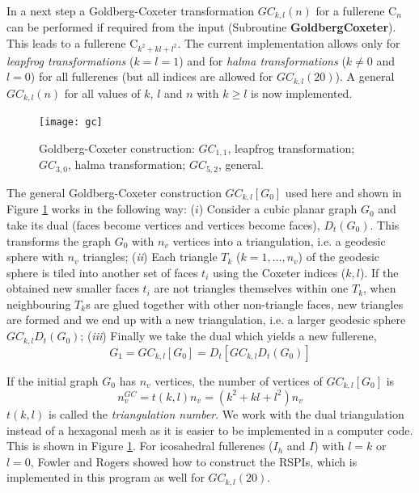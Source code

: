 \documentclass[article,a4paper,twoside]{memoir}
\newcommand{\C}[1]{\ensuremath{\mathrm{C}_{#1}}}
\newcommand{\funname}[1]{{\color{blue}\textbf{#1}}}
\begin{document}
In a next step a Goldberg-Coxeter transformation $GC_{k,l}(n)$ for a fullerene \C{n} can be performed if required from the input
(Subroutine \funname{GoldbergCoxeter}). This leads to a fullerene C$_{k^2+kl+l^2}$. The current implementation allows only for
\textit{leapfrog transformations} ($k=l=1$) and for \textit{halma transformations} ($k \neq 0$ and $l=0$) for all fullerenes
(but all indices are allowed for $GC_{k,l}(20)$). A general $GC_{k,l}(n)$ for all values of $k$, $l$ and $n$ with $k \geq l$ 
is now implemented. 


 \begin{figure}[htbp]
   	\centering
  	\texttt{[image: gc]}
    \caption{Goldberg-Coxeter construction: $GC_{1,1}$, leapfrog transformation; $GC_{3,0}$, halma transformation; $GC_{5,2}$, general.}
	\label{pic:GoldbergCoxeter}
 \end{figure}

The general Goldberg-Coxeter construction $GC_{k,l}[G_{0}]$ used here and shown in Figure \ref{pic:GoldbergCoxeter}
works in the following way: ($i$) Consider
a cubic planar graph $G_{0}$ and take its dual (faces become vertices and
vertices become faces), $D_{t}(G_{0})$. This transforms the graph $G_{0}$
with $n_v$ vertices into a triangulation, i.e. a geodesic sphere with $n_v$ triangles; (\textit{ii})
Each triangle $T_{k}$ ($k=1, \dots, n_{v}$) of the geodesic sphere is
tiled into another set of faces $t_i$ using the Coxeter indices ($k,l$).
If the obtained new smaller faces $t_i$ are not
triangles themselves within one $T_k$, when neighbouring $T_k$s are glued
together with other non-triangle faces, new triangles are formed and we end up with a new triangulation,
i.e. a larger geodesic sphere $GC_{k,l}D_{t}(G_{0})$;
(\textit{iii}) Finally we take the dual which yields a new fullerene,
\begin{equation}
 	G_1 = GC_{k,l}[G_0] = D_t[GC_{k,l} D_t(G_0)]
	\label{eq:GC}
\end{equation}

If the initial graph $G_0$ has $n_v$ vertices, the number of vertices of $GC_{k,l}[G_0]$ is
\begin{equation}
	n_v^{GC} = t(k,l)n_v = (k^2 + kl + l^2)n_v
	\label{eq:GCvertexcount} 
\end{equation}
$t(k,l)$ is called the {\em triangulation number}. We work with the dual triangulation instead of
a hexagonal mesh as it is easier to be implemented in a computer code.
This is shown in Figure \ref{pic:GoldbergCoxeter}. For icosahedral fullerenes ($I_h$ and $I$) with $l = k$ or $l = 0$, Fowler and Rogers 
showed how to construct the RSPIs,\cite{Rogers} which is implemented in this program as well for $GC_{k,l}(20)$.
\end{document}
